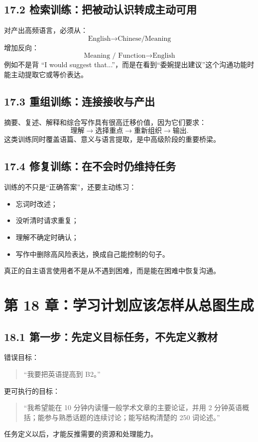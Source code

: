 \documentclass[11pt,a4paper]{ctexart}
\begin{document}
\subsection{17.2 检索训练：把被动认识转成主动可用}
对产出高频语言，必须从：
\[
\text{English}\rightarrow\text{Chinese/Meaning}
\]
增加反向：
\[
\boxed{\text{Meaning / Function}\rightarrow\text{English}}
\]
例如不是背 “I would suggest that...”，而是在看到“委婉提出建议”这个沟通功能时能主动提取它或等价表达。

\subsection{17.3 重组训练：连接接收与产出}
摘要、复述、解释和综合写作具有很高迁移价值，因为它们要求：
\[
\text{理解}\rightarrow\text{选择重点}\rightarrow\text{重新组织}\rightarrow\text{输出}.
\]
这类训练同时覆盖语篇、意义与语言提取，是中高级阶段的重要桥梁。

\subsection{17.4 修复训练：在不会时仍维持任务}
训练的不只是“正确答案”，还要主动练习：
\begin{itemize}
  \item 忘词时改述；
  \item 没听清时请求重复；
  \item 理解不确定时确认；
  \item 写作中删除高风险表达，换成自己能控制的句子。
\end{itemize}
真正的自主语言使用者不是从不遇到困难，而是能在困难中恢复沟通。

\newpage
\section{第 18 章：学习计划应该怎样从总图生成}

\subsection{18.1 第一步：先定义目标任务，不先定义教材}
错误目标：
\begin{quote}
“我要把英语提高到 B2。”
\end{quote}
更可执行的目标：
\begin{quote}
“我希望能在 10 分钟内读懂一般学术文章的主要论证，并用 2 分钟英语概括；能参与熟悉话题的连续讨论；能写结构清楚的 250 词论述。”
\end{quote}
任务定义以后，才能反推需要的资源和处理能力。
\end{document}
